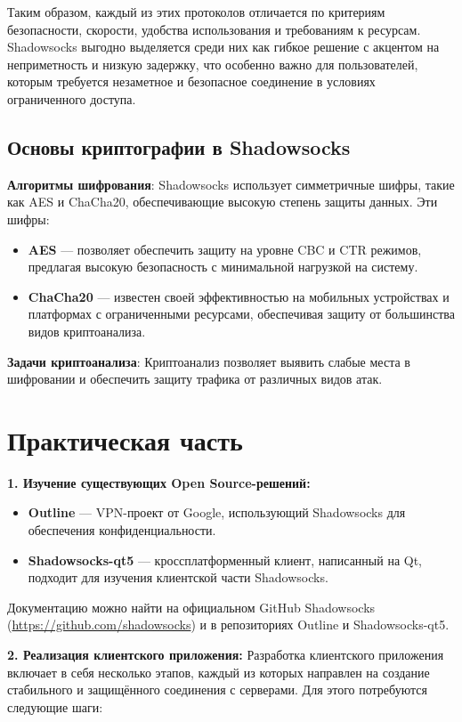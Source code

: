 \documentclass{SCWorks}
\begin{document}
Таким образом, каждый из этих протоколов отличается по критериям безопасности, скорости, удобства использования и требованиям к ресурсам. Shadowsocks выгодно выделяется среди них как гибкое решение с акцентом на неприметность и низкую задержку, что особенно важно для пользователей, которым требуется незаметное и безопасное соединение в условиях ограниченного доступа.

\subsection{Основы криптографии в Shadowsocks}

\textbf{Алгоритмы шифрования}: Shadowsocks использует симметричные шифры, такие как AES и ChaCha20, обеспечивающие высокую степень защиты данных. Эти шифры:
\begin{itemize}
    \item \textbf{AES} --- позволяет обеспечить защиту на уровне CBC и CTR режимов, предлагая высокую безопасность с минимальной нагрузкой на систему.
    \item \textbf{ChaCha20} --- известен своей эффективностью на мобильных устройствах и платформах с ограниченными ресурсами, обеспечивая защиту от большинства видов криптоанализа.
\end{itemize}

\textbf{Задачи криптоанализа}: Криптоанализ позволяет выявить слабые места в шифровании и обеспечить защиту трафика от различных видов атак.

\newpage

\section{Практическая часть}

\textbf{1. Изучение существующих Open Source-решений:}
\begin{itemize}
    \item \textbf{Outline} --- VPN-проект от Google, использующий Shadowsocks для обеспечения конфиденциальности.
    \item \textbf{Shadowsocks-qt5} --- кроссплатформенный клиент, написанный на Qt, подходит для изучения клиентской части Shadowsocks.
\end{itemize}
Документацию можно найти на официальном GitHub Shadowsocks (\url{https://github.com/shadowsocks}) и в репозиториях Outline и Shadowsocks-qt5.

\textbf{2. Реализация клиентского приложения:}  
Разработка клиентского приложения включает в себя несколько этапов, каждый из которых направлен на создание стабильного и защищённого соединения с серверами. Для этого потребуются следующие шаги:
\end{document}
